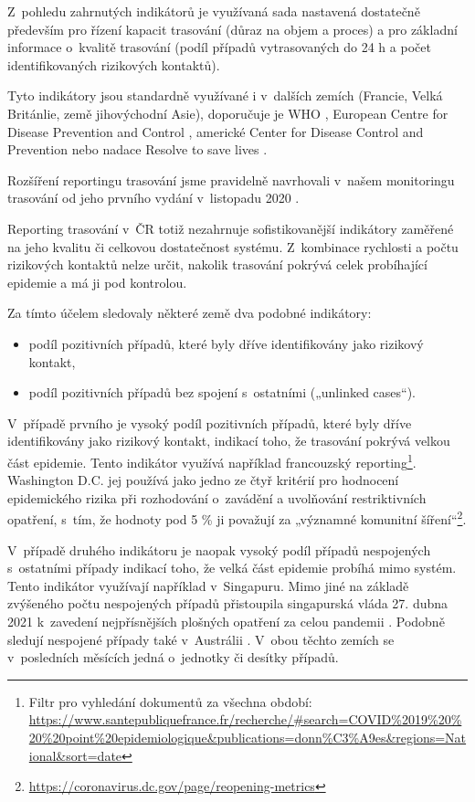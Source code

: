 Z~pohledu zahrnutých indikátorů je využívaná sada nastavená dostatečně pře\-de\-vším pro řízení kapacit trasování (důraz na objem a proces) a pro základní informace o~kvalitě trasování (podíl případů vytrasovaných do 24 h a počet identifikovaných rizikových kontaktů).

Tyto indikátory jsou standardně využívané i v~dalších zemích (Francie, Velká Británlie, země jihovýchodní Asie), doporučuje je WHO \cite{tr_WHO_2021}, European Centre for Disease Prevention and Control \cite{tr_ECDC_2020} , americké Center for Disease Control and Prevention \cite{tr_CDC_2020} nebo nadace Resolve to save lives \cite{tr_contact_tracing}.

Rozšíření reportingu trasování jsme pravidelně navrhovali v~našem monitoringu trasování od jeho prvního vydání v~listopadu 2020 \cite{tr_bisop07}.

Reporting trasování v~ČR totiž nezahrnuje sofistikovanější indikátory zaměřené na jeho kvalitu či celkovou dostatečnost systému. Z~kombinace rychlosti a počtu rizikových kontaktů nelze určit, nakolik trasování pokrývá celek probíhající epidemie a má ji pod kontrolou.

Za tímto účelem sledovaly některé země dva podobné indikátory:
\begin{itemize}
\item podíl pozitivních případů, které byly dříve identifikovány jako rizikový kontakt,
\item podíl pozitivních případů bez spojení s~ostatními („unlinked cases“).
\end{itemize}

V~případě prvního je vysoký podíl pozitivních případů, které byly dříve identifikovány jako rizikový kontakt, indikací toho, že trasování pokrývá velkou část epidemie. Tento indikátor využívá například francouzský reporting\footnote{Filtr pro vyhledání dokumentů za všechna období: \url{https://www.santepubliquefrance.fr/recherche/\#search=COVID\%2019\%20\%20\%20point\%20epidemiologique&publications=donn\%C3\%A9es&regions=National&sort=date}}. Washington D.C. jej používá jako jedno ze čtyř kritérií pro hodnocení epidemického rizika při rozhodování o~zavádění a uvolňování restriktivních opatření, s~tím, že hodnoty pod 5 \% ji považují za „významné komunitní šíření“\footnote{\url{https://coronavirus.dc.gov/page/reopening-metrics}}.


V~případě druhého indikátoru je naopak vysoký podíl případů nespojených s~os\-tat\-ní\-mi případy indikací toho, že velká část epidemie probíhá mimo systém. Tento indikátor využívají například v~Singapuru. Mimo jiné na základě zvýšeného počtu nespojených případů přistoupila singapurská vláda 27. dubna 2021 k~zavedení nej\-pří\-sněj\-ších plošných opatření za celou pandemii \cite{tr_Singapour}. Podobně sledují nespojené případy také v~Austrálii \cite{tr_australie}. V~obou těchto zemích se v~posledních měsících jedná o~jednotky či desítky případů.

